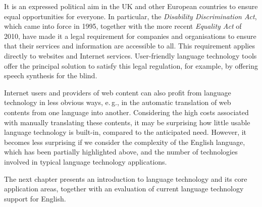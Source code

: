 \begin{multicols}{2}
It is an expressed political aim in the UK and other European countries to ensure equal opportunities for everyone. In particular, the \textit{Disability Discrimination Act}, which came into force in 1995, together with the more recent \textit{Equality Act} of 2010, have made it a legal requirement for companies and organisations to ensure that their services and information are accessible to all. This requirement applies directly to websites and Internet services. User-friendly language technology tools offer the principal solution to satisfy this legal regulation, for example, by offering speech synthesis for the blind.
  
Internet users and providers of web content can also profit from language technology in less obvious ways, e.\,g., in the automatic translation of web contents from one language into another. Considering the high costs associated with manually translating these contents, it may be surprising how little usable language technology is built-in, compared to the anticipated need. However, it becomes less surprising if we consider the complexity of the English language, which has been partially highlighted above, and the number of technologies involved in typical language technology applications.


The next chapter presents an introduction to language technology and its core application areas, together with an evaluation of current language technology support for English.
\end{multicols}

\clearpage



